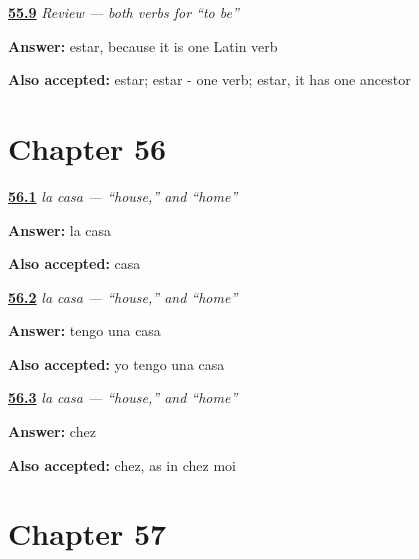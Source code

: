 \noindent\begin{minipage}[t]{\linewidth}
\raggedright
\hyperlink{review-ES-C09-repaso-ser-estar-why}{\textbf{55.9}} \emph{Review — both verbs for \textquotedblleft{}to be\textquotedblright{}}\par
\small \textbf{Answer:} estar, because it is one Latin verb\par
\footnotesize \textbf{Also accepted:} estar; estar - one verb; estar, it has one ancestor
\end{minipage}\par\medskip

\section*{Chapter 56}

\noindent\begin{minipage}[t]{\linewidth}
\raggedright
\hyperlink{review-ES-C43-casa-article}{\textbf{56.1}} \emph{la casa — \textquotedblleft{}house,\textquotedblright{} and \textquotedblleft{}home\textquotedblright{}}\par
\small \textbf{Answer:} la casa\par
\footnotesize \textbf{Also accepted:} casa
\end{minipage}\par\medskip

\noindent\begin{minipage}[t]{\linewidth}
\raggedright
\hyperlink{review-ES-C43-casa-have}{\textbf{56.2}} \emph{la casa — \textquotedblleft{}house,\textquotedblright{} and \textquotedblleft{}home\textquotedblright{}}\par
\small \textbf{Answer:} tengo una casa\par
\footnotesize \textbf{Also accepted:} yo tengo una casa
\end{minipage}\par\medskip

\noindent\begin{minipage}[t]{\linewidth}
\raggedright
\hyperlink{review-ES-C43-casa-french}{\textbf{56.3}} \emph{la casa — \textquotedblleft{}house,\textquotedblright{} and \textquotedblleft{}home\textquotedblright{}}\par
\small \textbf{Answer:} chez\par
\footnotesize \textbf{Also accepted:} chez, as in chez moi
\end{minipage}\par\medskip

\section*{Chapter 57}

